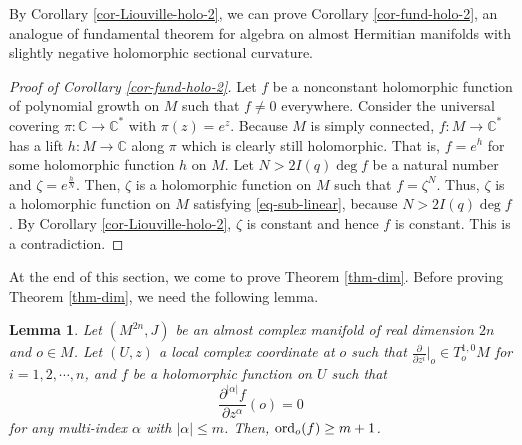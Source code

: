 \documentclass[12pt]{amsart}
\def\p{\partial}
\newcommand\C{{\mathbb C}}
\newtheorem{lem}{Lemma}[section]
\theoremstyle{definition}
\theoremstyle{remark}
\numberwithin{equation}{section}
\def\ord{{\rm ord}}
\begin{document}
By Corollary \ref{cor-Liouville-holo-2}, we can prove Corollary \ref{cor-fund-holo-2}, an analogue of fundamental theorem for algebra on almost Hermitian manifolds with slightly negative holomorphic sectional curvature.
\begin{proof}[Proof of Corollary \ref{cor-fund-holo-2}]
 Let $f$ be a nonconstant holomorphic function of polynomial growth on $M$ such that $f\neq 0$ everywhere.  Consider the universal covering $\pi:\C\to \C^*$ with $\pi(z)=e^z$. Because $M$ is simply connected, $f:M\to \C^*$ has a lift $h:M\to \C$ along $\pi$ which is clearly still holomorphic. That is, $f=e^{h}$ for some holomorphic function $h$ on $M$. Let $N>2I(q)\deg f$ be a natural number  and $\zeta=e^\frac{h}{N}$. Then, $\zeta$ is a holomorphic function on $M$ such that $f=\zeta^N$. Thus, $\zeta$ is a holomorphic function on $M$ satisfying \eqref{eq-sub-linear}, because $N>2I(q)\deg f$. By Corollary \ref{cor-Liouville-holo-2}, $\zeta$ is constant and hence $f$ is constant. This is a contradiction.
\end{proof}
At the end of this section, we come to prove Theorem \ref{thm-dim}. Before proving Theorem \ref{thm-dim}, we need the following lemma.
\begin{lem}\label{lem-vanishing-order}
Let $(M^{2n}, J)$ be an almost complex manifold of real dimension $2n$ and $o\in M$. Let $(U,z)$ a local complex coordinate at $o$ such that $\frac{\p}{\p z^i}\big|_o\in T^{1,0}_oM$ for $i=1,2,\cdots,n$, and $f$ be a holomorphic function on $U$ such that
$$\frac{\p^{|\alpha|} f}{\p z^\alpha}(o)=0$$
 for any multi-index $\alpha$ with $|\alpha|\leq m$. Then, $\ord_o(f)\geq m+1$.
\end{lem}
\end{document}
